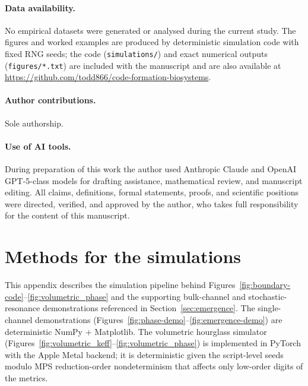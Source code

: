 \documentclass[12pt]{article}
\theoremstyle{definition}
\begin{document}
\paragraph{Data availability.} No empirical datasets were generated or analysed during the current study. The figures and worked examples are produced by deterministic simulation code with fixed RNG seeds; the code (\texttt{simulations/}) and exact numerical outputs (\texttt{figures/*.txt}) are included with the manuscript and are also available at \url{https://github.com/todd866/code-formation-biosystems}.

\paragraph{Author contributions.} Sole authorship.

\paragraph{Use of AI tools.} During preparation of this work the author used Anthropic Claude and OpenAI GPT-5-class models for drafting assistance, mathematical review, and manuscript editing. All claims, definitions, formal statements, proofs, and scientific positions were directed, verified, and approved by the author, who takes full responsibility for the content of this manuscript.

\appendix

\section{Methods for the simulations}
\label{app:methods}

This appendix describes the simulation pipeline behind Figures~\ref{fig:boundary-code}--\ref{fig:volumetric_phase} and the supporting bulk-channel and stochastic-resonance demonstrations referenced in Section~\ref{sec:emergence}. The single-channel demonstrations (Figures~\ref{fig:phase-demo}--\ref{fig:emergence-demo}) are deterministic NumPy + Matplotlib. The volumetric hourglass simulator (Figures~\ref{fig:volumetric_keff}--\ref{fig:volumetric_phase}) is implemented in PyTorch with the Apple Metal backend; it is deterministic given the script-level seeds modulo MPS reduction-order nondeterminism that affects only low-order digits of the metrics.
\end{document}
